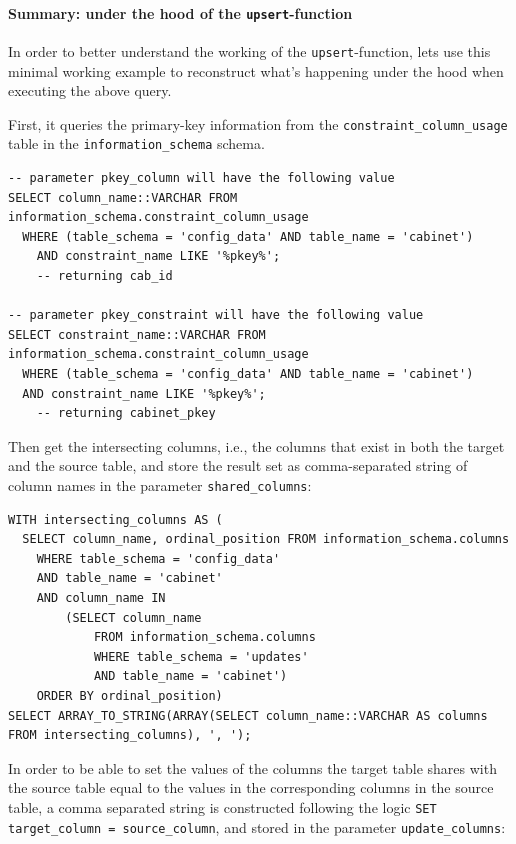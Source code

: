 \paragraph{Summary: under the hood of the \texttt{upsert}-function} 
In order to better understand the working of the \texttt{upsert}-function, lets use this minimal working example to reconstruct what's happening under the hood when executing the above query.

First, it queries the primary-key information from the \texttt{constraint\_column\_usage} table in the \texttt{information\_schema} schema.

\begin{lstlisting}[language=postgreSQL]
-- parameter pkey_column will have the following value
SELECT column_name::VARCHAR FROM information_schema.constraint_column_usage 
  WHERE (table_schema = 'config_data' AND table_name = 'cabinet')
	AND constraint_name LIKE '%pkey%';
	-- returning cab_id
	
-- parameter pkey_constraint will have the following value
SELECT constraint_name::VARCHAR FROM information_schema.constraint_column_usage 
  WHERE (table_schema = 'config_data' AND table_name = 'cabinet')
  AND constraint_name LIKE '%pkey%';
	-- returning cabinet_pkey
\end{lstlisting}

Then get the intersecting columns, i.e., the columns that exist in both the target and the source table, and store the result set as comma-separated string of column names in the parameter \texttt{shared\_columns}:

\begin{lstlisting}[language=postgreSQL]
WITH intersecting_columns AS (
  SELECT column_name, ordinal_position FROM information_schema.columns 
  	WHERE table_schema = 'config_data' 
  	AND table_name = 'cabinet'
  	AND column_name IN 
  		(SELECT column_name 
  			FROM information_schema.columns 
  			WHERE table_schema = 'updates'
  			AND table_name = 'cabinet')
  	ORDER BY ordinal_position)
SELECT ARRAY_TO_STRING(ARRAY(SELECT column_name::VARCHAR AS columns FROM intersecting_columns), ', ');	
\end{lstlisting}

In order to be able to set the values of the columns the target table shares with the source table equal to the values in the corresponding columns in the source table, a comma separated string is constructed following the logic \texttt{SET target\_column = source\_column}, and stored in the parameter \texttt{update\_columns}:

